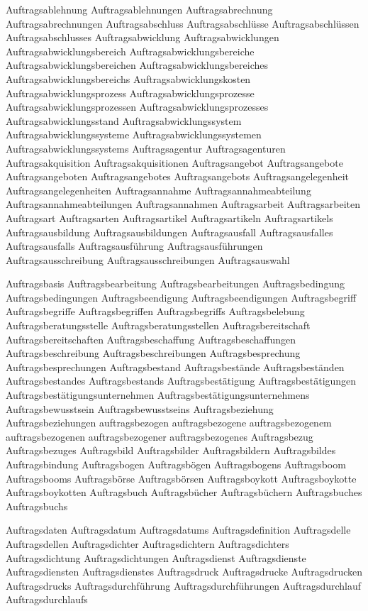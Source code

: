 Auftragsablehnung
Auftragsablehnungen
Auftragsabrechnung
Auftragsabrechnungen
Auftragsabschluss
Auftragsabschlüsse
Auftragsabschlüssen
Auftragsabschlusses
Auftragsabwicklung
Auftragsabwicklungen
Auftragsabwicklungsbereich
Auftragsabwicklungsbereiche
Auftragsabwicklungsbereichen
Auftragsabwicklungsbereiches
Auftragsabwicklungsbereichs
Auftragsabwicklungskosten
Auftragsabwicklungsprozess
Auftragsabwicklungsprozesse
Auftragsabwicklungsprozessen
Auftragsabwicklungsprozesses
Auftragsabwicklungsstand
Auftragsabwicklungssystem
Auftragsabwicklungssysteme
Auftragsabwicklungssystemen
Auftragsabwicklungssystems
Auftragsagentur
Auftragsagenturen
Auftragsakquisition
Auftragsakquisitionen
Auftragsangebot
Auftragsangebote
Auftragsangeboten
Auftragsangebotes
Auftragsangebots
Auftragsangelegenheit
Auftragsangelegenheiten
Auftragsannahme
Auftragsannahmeabteilung
Auftragsannahmeabteilungen
Auftragsannahmen
Auftragsarbeit
Auftragsarbeiten
Auftragsart
Auftragsarten
Auftragsartikel
Auftragsartikeln
Auftragsartikels
Auftragsausbildung
Auftragsausbildungen
Auftragsausfall
Auftragsausfalles
Auftragsausfalls
Auftragsausführung
Auftragsausführungen
Auftragsausschreibung
Auftragsausschreibungen
Auftragsauswahl

Auftragsbasis
Auftragsbearbeitung
Auftragsbearbeitungen
Auftragsbedingung
Auftragsbedingungen
Auftragsbeendigung
Auftragsbeendigungen
Auftragsbegriff
Auftragsbegriffe
Auftragsbegriffen
Auftragsbegriffs
Auftragsbelebung
Auftragsberatungsstelle
Auftragsberatungsstellen
Auftragsbereitschaft
Auftragsbereitschaften
Auftragsbeschaffung
Auftragsbeschaffungen
Auftragsbeschreibung
Auftragsbeschreibungen
Auftragsbesprechung
Auftragsbesprechungen
Auftragsbestand
Auftragsbestände
Auftragsbeständen
Auftragsbestandes
Auftragsbestands
Auftragsbestätigung
Auftragsbestätigungen
Auftragsbestätigungsunternehmen
Auftragsbestätigungsunternehmens
Auftragsbewusstsein
Auftragsbewusstseins
Auftragsbeziehung
Auftragsbeziehungen
auftragsbezogen
auftragsbezogene
auftragsbezogenem
auftragsbezogenen
auftragsbezogener
auftragsbezogenes
Auftragsbezug
Auftragsbezuges
Auftragsbild
Auftragsbilder
Auftragsbildern
Auftragsbildes
Auftragsbindung
Auftragsbogen
Auftragsbögen
Auftragsbogens
Auftragsboom
Auftragsbooms
Auftragsbörse
Auftragsbörsen
Auftragsboykott
Auftragsboykotte
Auftragsboykotten
Auftragsbuch
Auftragsbücher
Auftragsbüchern
Auftragsbuches
Auftragsbuchs

Auftragsdaten
Auftragsdatum
Auftragsdatums
Auftragsdefinition
Auftragsdelle
Auftragsdellen
Auftragsdichter
Auftragsdichtern
Auftragsdichters
Auftragsdichtung
Auftragsdichtungen
Auftragsdienst
Auftragsdienste
Auftragsdiensten
Auftragsdienstes
Auftragsdruck
Auftragsdrucke
Auftragsdrucken
Auftragsdrucks
Auftragsdurchführung
Auftragsdurchführungen
Auftragsdurchlauf
Auftragsdurchlaufs

